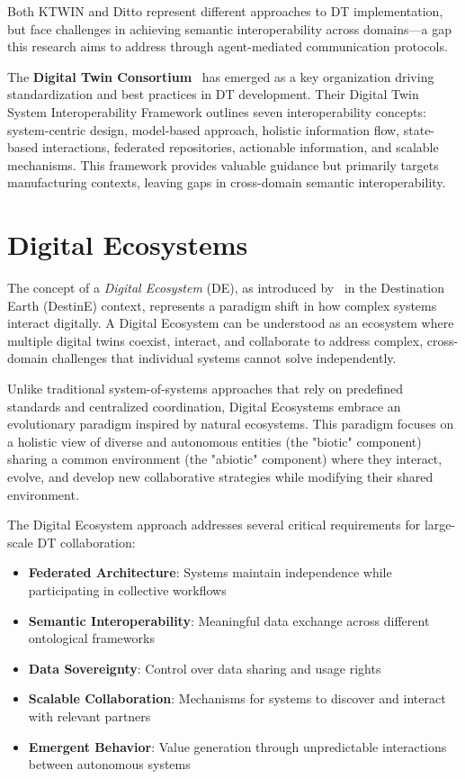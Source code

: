 Both KTWIN and Ditto represent different approaches to DT implementation,
    but face challenges in achieving semantic interoperability across domains—a gap 
    this research aims to address through agent-mediated communication protocols.

The \textbf{Digital Twin Consortium}~\cite{Budiardjo_2021}
    has emerged as a key organization driving standardization and best practices in DT development.
Their Digital Twin System Interoperability Framework outlines seven interoperability concepts:
    system-centric design,
    model-based approach,
    holistic information flow,
    state-based interactions,
    federated repositories,
    actionable information, and
    scalable mechanisms.
This framework provides valuable guidance but primarily targets manufacturing contexts,
    leaving gaps in cross-domain semantic interoperability.

\section{Digital Ecosystems}

The concept of a \emph{Digital Ecosystem} (DE), as introduced by~\cite{Nativi_2021} in the Destination Earth (DestinE) context, represents
    a paradigm shift in how complex systems interact digitally.
A Digital Ecosystem can be understood as an ecosystem where multiple digital twins coexist, interact, and collaborate 
    to address complex, cross-domain challenges that individual systems cannot solve independently.

Unlike traditional system-of-systems approaches that rely on predefined standards and centralized coordination,
    Digital Ecosystems embrace an evolutionary paradigm inspired by natural ecosystems.
This paradigm focuses on a holistic view of diverse and autonomous entities (the "biotic" component)
    sharing a common environment (the "abiotic" component) where they interact, evolve, and develop
    new collaborative strategies while modifying their shared environment.

The Digital Ecosystem approach addresses several critical requirements for large-scale DT collaboration:
\begin{itemize}
    \item \textbf{Federated Architecture}: Systems maintain independence while participating in collective workflows
    \item \textbf{Semantic Interoperability}: Meaningful data exchange across different ontological frameworks
    \item \textbf{Data Sovereignty}: Control over data sharing and usage rights
    \item \textbf{Scalable Collaboration}: Mechanisms for systems to discover and interact with relevant partners
    \item \textbf{Emergent Behavior}: Value generation through unpredictable interactions between autonomous systems
\end{itemize}

